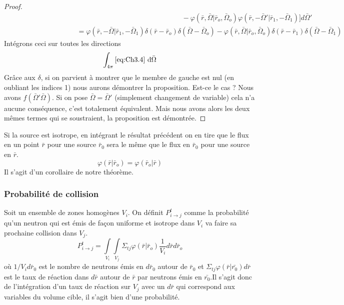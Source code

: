 \begin{proof}
\begin{equation}
\begin{array}{l}
\quad \quad \quad \quad \quad \quad \quad \quad \quad \quad \quad \quad \quad \quad \quad \quad \quad \quad \quad \quad \quad \quad \quad \quad \quad  - \varphi (\bar r,\bar \Omega |{{\bar r}_o},{{\bar \Omega }_o})\varphi (\bar r, - \bar \Omega '|{{\bar r}_1}, - {{\bar \Omega }_1})]d\bar \Omega '\\
\quad \quad \quad \quad \quad \quad \quad \quad \quad \quad  = \varphi (\bar r, - \bar \Omega |{{\bar r}_1}, - {{\bar \Omega }_1})\delta (\bar r - {{\bar r}_o})\delta (\bar \Omega  - {{\bar \Omega }_o}) - \varphi (\bar r,\bar \Omega |{{\bar r}_o},{{\bar \Omega }_o})\delta (\bar r - {{\bar r}_1})\delta (\bar \Omega  - {{\bar \Omega }_1})
\end{array}
\label{eq:Ch3.4}
\end{equation}
Intégrons ceci sur toutes les directions
\begin{equation}
\int_{4\pi} \eqref{eq:Ch3.4}\ \text{d}\bar\Omega
\end{equation}
Grâce aux $\delta$, si on parvient à montrer que le membre de gauche est nul (en oubliant les indices
1) nous aurons démontrer la proposition. Est-ce le cas ? Nous avons $f(\bar \Omega'\bar \Omega)$. Si 
on pose $\bar \Omega=\bar \Omega'$ (simplement changement de variable) cela n'a aucune conséquence, 
c'est totalement équivalent. Mais nous avons alors les deux mêmes termes qui se soustraient, la 
proposition est démontrée.
\end{proof}
Si la source est isotrope, en intégrant le résultat précédent on en tire que le flux en un point 
$\bar r$ pour une source $\bar r_0$ sera le même que le flux en $\bar r_0$ pour une source en 
$\bar r$.
\begin{equation}
\varphi (\bar r|{\bar r_o}) = \varphi ({\bar r_o}|\bar r)
\end{equation}
Il s'agit d'un corollaire de notre théorème. 

\subsubsection{Probabilité de collision}
Soit un ensemble de zones homogènes $V_i$. On définit $P_{i\to j}^t$ comme la probabilité qu'un 
neutron qui est émis de façon uniforme et isotrope dans $V_i$ va faire sa prochaine collision dans 
$V_j$.
\begin{equation}
P_{i \to j}^t = \int\limits_{{V_i}}   \int\limits_{{V_j}} {  {\Sigma _{tj}}} \varphi (\bar r|{\bar r_o})\frac{1}{{{V_i}}}d\bar rd{\bar r_o}
\end{equation}
où $1/V_id\bar r_0$ est le nombre de neutrons émis en $d\bar r_0$ autour de $\bar r_0$ et 
$\Sigma_{tj}\varphi(\bar r|\bar{r_0})d\bar{r}$ est le taux de réaction dans $d\bar{r}$ autour de
$\bar r$ par neutrons émis en $\bar{r_0}$.Il s'agit donc de l'intégration d'un taux de réaction sur
$V_j$ avec un $d\bar r$ qui correspond aux variables du volume cible, il s'agit bien d'une 
probabilité.\\

